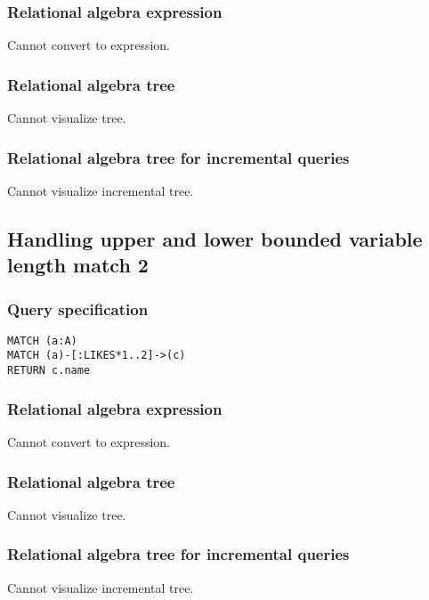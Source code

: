 \subsubsection*{Relational algebra expression}

Cannot convert to expression.

\subsubsection*{Relational algebra tree}

Cannot visualize tree.

\subsubsection*{Relational algebra tree for incremental queries}

Cannot visualize incremental tree.

\subsection{Handling upper and lower bounded variable length match 2}

\subsubsection*{Query specification}

\begin{lstlisting}
MATCH (a:A)
MATCH (a)-[:LIKES*1..2]->(c)
RETURN c.name
\end{lstlisting}

\subsubsection*{Relational algebra expression}

Cannot convert to expression.

\subsubsection*{Relational algebra tree}

Cannot visualize tree.

\subsubsection*{Relational algebra tree for incremental queries}

Cannot visualize incremental tree.

